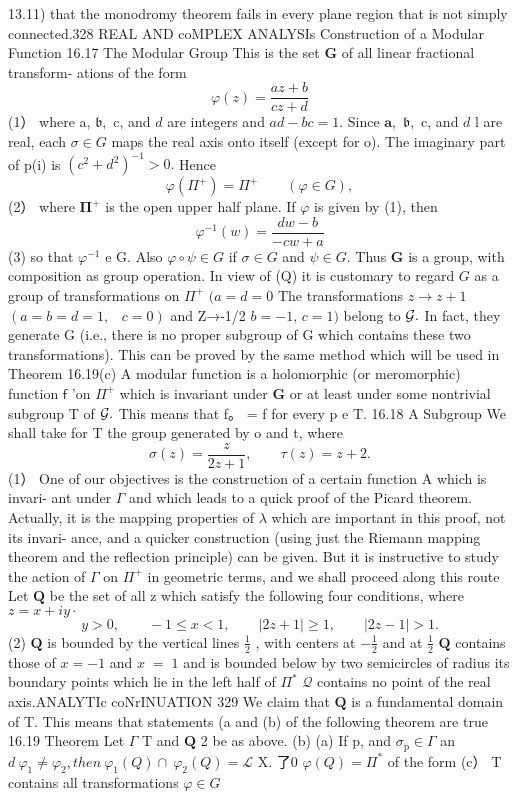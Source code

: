 13.11) that the monodromy theorem fails in every plane region that is not simply connected.328 REAL AND coMPLEX ANALYSIs Construction of a Modular Function 16.17 The Modular Group This is the set ${\boldsymbol{G}}$ of all linear fractional transform- ations of the form $$ \varphi(z)={\frac{a z+b}{c z+d}} $$ (1） where a, ${\mathfrak{b}},$ c, and $d$ are integers and $a d-b c=1.$ Since ${\boldsymbol{a}},$ ${\mathfrak{b}},$ c, and $d$ l are real, each $\scriptstyle{\sigma\in G}$ maps the real axis onto itself (except for o). The imaginary part of p(i) is $(c^{2}+d^{2})^{-1}>0.$ Hence $$ \varphi(\Pi^{+})=\Pi^{+}\qquad(\varphi\in G), $$ (2） where ${\boldsymbol{\Pi}}^{+}$ is the open upper half plane. If $\varphi$ is given by (1), then $$ \varphi^{-1}(w)={\frac{d w-b}{-c w+a}} $$ (3) so that $\varphi^{-1}$ e G. Also $\varphi\circ\psi\in G$ if $\sigma\in G$ and $\psi\in G.$ Thus ${\boldsymbol{G}}$ is a group, with composition as group operation. In view of (Q) it is customary to regard $\boldsymbol{\mathit{G}}$ as a group of transformations on $\Pi^{+}$ $(a=d=0$ The transformations $z\to z+1$ $(a=b=d=1,\;\;\;c=0)$ and Z→-1/2 $b=-1,\,c=1)$ belong to ${\cal G}.$ In fact, they generate G (i.e., there is no proper subgroup of G which contains these two transformations). This can be proved by the same method which will be used in Theorem 16.19(c) A modular function is a holomorphic (or meromorphic) function $\boldsymbol{\mathsf{f}}$ 'on $\Pi^{+}$ which is invariant under ${\boldsymbol{G}}$ or at least under some nontrivial subgroup T of ${\cal G}.$ This means that f。 = f for every p e T. 16.18 A Subgroup We shall take for T the group generated by o and t, where $$ \sigma(z)={\frac{z}{2z+1}},\qquad\tau(z)=z+2. $$ (1） One of our objectives is the construction of a certain function A which is invari- ant under $\Gamma$ and which leads to a quick proof of the Picard theorem. Actually, it is the mapping properties of $\lambda$ which are important in this proof, not its invari- ance, and a quicker construction (using just the Riemann mapping theorem and the reflection principle) can be given. But it is instructive to study the action of ${\Gamma}$ on $\Pi^{+}$ in geometric terms, and we shall proceed along this route Let ${\boldsymbol{Q}}$ be the set of all z which satisfy the following four conditions, where $z=x+i y\cdot$ $$ y>0,\qquad-1\leq x<1,\qquad|2z+1|\geq1,\qquad|2z-1|>1. $$ (2) ${\boldsymbol{Q}}$ is bounded by the vertical lines $\frac{1}{2}$ , with centers at $-{\frac{1}{2}}$ and at $\frac{1}{2}$ ${\boldsymbol{Q}}$ contains those of $x=-1$ and $\scriptstyle x\;=\;1$ and is bounded below by two semicircles of radius its boundary points which lie in the left half of $\Pi^{*}$ $\textstyle{\mathcal{Q}}$ contains no point of the real axis.ANALYTIc coNrINUATION 329 We claim that ${\boldsymbol{Q}}$ is a fundamental domain of T. This means that statements (a and (b) of the following theorem are true 16.19 Theorem Let ${\Gamma}$ T and ${\boldsymbol{Q}}$ 2 be as above. (b) (a) If p, and $\scriptstyle\sigma_{\mathrm{p}}\in\Gamma$ an $d\ {\varphi}_{1}\neq{\varphi}_{2},t h e n\ {\varphi}_{1}(Q)\cap\ {\varphi}_{2}(Q)={\mathcal{L}}$ X. 了0 $\varphi(Q)=\Pi^{*}$ of the form (c） T contains all transformations $\scriptstyle\varphi\in G$ 